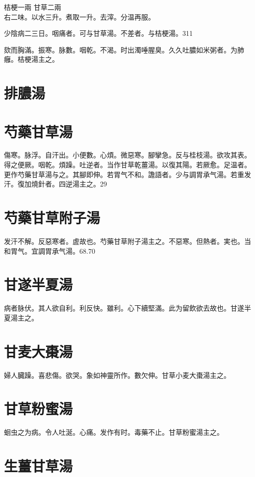 \documentclass[b5paper,twoside,zihao=-4,UTF8]{ctexbook}
\begin{document}
桔梗{\scriptsize 一兩} 甘草{\scriptsize 二兩}\\
右二味。以水三升。煮取一升。去滓。分温再服。

少陰病二三日。咽痛者。可与甘草湯。不差者。与桔梗湯。311

欬而胸滿。振寒。脉數。咽乾。不渴。时出濁唾腥臭。久久吐膿如米粥者。为肺癰。桔梗湯主之。

\section{排膿湯}

\section{芍藥甘草湯}

傷寒。脉浮。自汗出。小便數。心煩。微惡寒。腳攣急。反与桂枝湯。欲攻其表。得之便厥。咽乾。煩躁。吐逆者。当作甘草乾薑湯。以復其陽。若厥愈。足温者。更作芍藥甘草湯与之。其腳即伸。若胃气不和。譫語者。少与{調胃}承气湯。若重发汗。復加燒針者。四逆湯主之。29

\section{芍藥甘草附子湯}

发汗不解。反惡寒者。虗故也。芍藥甘草附子湯主之。不惡寒。但熱者。実也。当和胃气。宜調胃承气湯。68.70

\section{甘遂半夏湯}

病者脉伏。其人欲自利。利反快。雖利。心下續堅滿。此为留飲欲去故也。甘遂半夏湯主之。

\section{甘麦大棗湯}

婦人臓躁。喜悲傷。欲哭。象如神靈所作。數欠伸。甘{草小}麦大棗湯主之。

\section{甘草粉蜜湯}

蛔虫之为病。令人吐涎。心痛。发作有时。毒藥不止。甘草粉蜜湯主之。

\section{生薑甘草湯}
\end{document}
